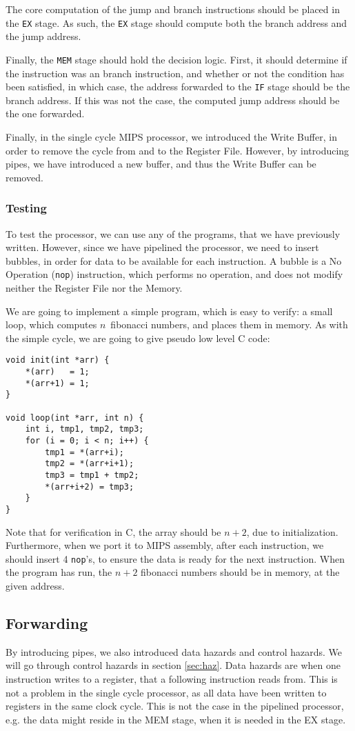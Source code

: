 The core computation of the jump and branch instructions should be placed in
the \texttt{EX} stage. As such, the \texttt{EX} stage should compute both the
branch address and the jump address.

Finally, the \texttt{MEM} stage should hold the decision logic. First, it
should determine if the instruction was an branch instruction, and whether or
not the condition has been satisfied, in which case, the  address forwarded to
the \texttt{IF} stage should be the branch address. If this was not the case,
the computed jump address should be the one forwarded.

Finally, in the single cycle MIPS processor, we introduced the Write Buffer, in
order to remove the cycle from and to the Register File. However, by
introducing pipes, we have introduced a new buffer, and thus the Write Buffer
can be removed.

\subsubsection*{Testing}
To test the processor, we can use any of the programs, that we have previously
written. However, since we have pipelined the processor, we need to insert
bubbles, in order for data to be available for each instruction. A bubble is a
No Operation (\texttt{nop}) instruction, which performs no operation, and does
not modify neither the Register File nor the Memory.

We are going to implement a simple program, which is easy to verify: a small
loop, which computes $n$ fibonacci numbers, and places them in memory. As with
the simple cycle, we are going to give pseudo low level C code:
\begin{lstlisting}
void init(int *arr) {
    *(arr)   = 1;
    *(arr+1) = 1;
}

void loop(int *arr, int n) {
    int i, tmp1, tmp2, tmp3;
    for (i = 0; i < n; i++) {
        tmp1 = *(arr+i);
        tmp2 = *(arr+i+1);
        tmp3 = tmp1 + tmp2;
        *(arr+i+2) = tmp3;
    }
}
\end{lstlisting}
Note that for verification in C, the array should be $n+2$, due to
initialization. Furthermore, when we port it to MIPS assembly, after each
instruction, we should insert 4 \texttt{nop}'s, to ensure the data is ready for
the next instruction. When the program has run, the $n+2$ fibonacci numbers
should be in memory, at the given address.

\subsection{Forwarding}\label{sec:forw}
By introducing pipes, we also introduced data hazards and control hazards. We
will go through control hazards in section \ref{sec:haz}. Data hazards are when
one instruction writes to a register, that a following instruction reads from.
This is not a problem in the single cycle processor, as all data have been
written to registers in the same clock cycle. This is not the case in the
pipelined processor, e.g. the data might reside in the MEM stage, when it is
needed in the EX stage.


